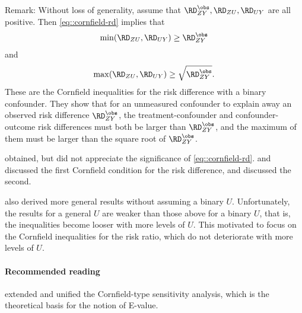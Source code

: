 Remark: Without loss of generality, assume that $\RD_{ZY}^\obs, \RD_{ZU} ,\RD_{UY}$ are all positive. Then \eqref{eq::cornfield-rd} implies that 
$$
\min(\RD_{ZU}  , \RD_{UY}) \geq \RD_{ZY}^\obs
$$
and
$$
\max(\RD_{ZU}  , \RD_{UY}) \geq  \sqrt{ \RD_{ZY}^\obs} .
$$
These are the Cornfield inequalities for the risk difference with a binary confounder.
They show that for an unmeasured confounder to explain away an observed risk difference $\RD_{ZY}^\obs$, the treatment-confounder and confounder-outcome risk differences must both be larger than $\RD_{ZY}^\obs$, and the maximum of them must be larger than the square root of $\RD_{ZY}^\obs$.

\citet{Cornfield::1959} obtained, but did not appreciate the significance of \eqref{eq::cornfield-rd}. \citet{gastwirth1998cornfield} and \citet{poole2010origin} discussed the first Cornfield condition for the risk difference, and \citet{ding2014generalized} discussed the second. 

\citet{ding2014generalized}  also derived more general results without assuming a binary $U$. Unfortunately, the results for a general $U$ are weaker than those above for a binary $U$, that is, the inequalities become looser with more levels of $U$. This motivated \citet{ding2016sensitivity} to focus on the Cornfield inequalities for the risk ratio, which do not deteriorate with more levels of $U$.




\paragraph{Recommended reading}


\citet{ding2016sensitivity}  extended and unified the Cornfield-type sensitivity analysis, which is the theoretical basis for the notion of E-value.   

